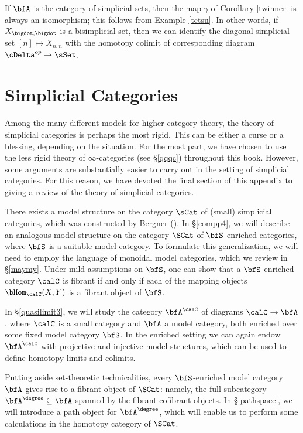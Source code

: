 \begin{example}\label{swupt}
If $\bfA$ is the category of simplicial sets, then the map $\gamma$ of Corollary \ref{twinner}
is always an isomorphism; this follows from Example \ref{tetsu}. In other words, if
$X_{\bigdot, \bigdot}$ is a bisimplicial set, then we can identify the diagonal simplicial set
$[n] \mapsto X_{n,n}$ with the homotopy colimit of corresponding diagram
$\cDelta^{op} \rightarrow \sSet$.
\end{example}

\section{Simplicial Categories}\label{techapp}

Among the many different models for higher category theory, the theory of simplicial categories
is perhaps the most rigid. This can be either a curse or a blessing, depending on the situation. 
For the most part, we have chosen to use the less rigid theory of $\infty$-categories (see \S \ref{qqqc}) throughout this book. However, some arguments are substantially easier to carry out in the setting of simplicial categories. For this reason, we have devoted the final section of this appendix to giving a review of the theory of simplicial categories.

There exists a model structure on the category $\sCat$ of (small) simplicial categories, which was constructed by Bergner (\cite{bergner}). In \S \ref{compp4}, we will describe an analogous model structure on the category $\SCat$ of $\bfS$-enriched categories, where $\bfS$ is a suitable model category.
To formulate this generalization, we will need to employ the language of monoidal model categories, which we review in \S \ref{maymy}. Under mild assumptions on $\bfS$, one can show that a $\bfS$-enriched
category $\calC$ is fibrant if and only if each of the mapping objects $\bHom_{\calC}(X,Y)$ is a fibrant object of $\bfS$.

In \S \ref{quasilimit3}, we will study the category $\bfA^{\calC}$ of diagrams $\calC \rightarrow \bfA$, where
$\calC$ is a small category and $\bfA$ a model category, both enriched over some
fixed model category $\bfS$. In the enriched setting we can again endow $\bfA^{\calC}$
with projective and injective model structures, which can be used to define homotopy limits and
colimits. 

Putting aside set-theoretic technicalities, every $\bfS$-enriched model category $\bfA$
gives rise to a fibrant object of $\SCat$: namely, the full subcategory
$\bfA^{\degree} \subseteq \bfA$ spanned by the fibrant-cofibrant objects. In \S \ref{pathspace}, we
will introduce a path object for $\bfA^{\degree}$, which will enable us to perform some calculations in
the homotopy category of $\SCat$. 


